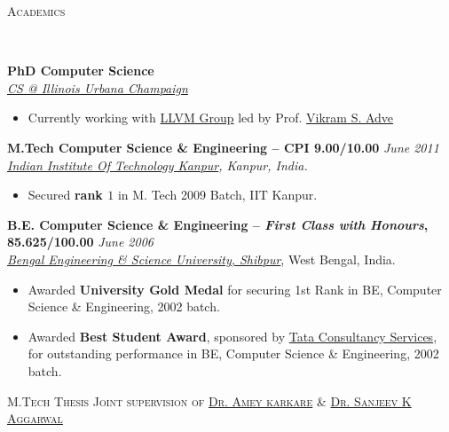 \documentclass[9pt]{article}
\newenvironment{changemargin}[2]{%
  \begin{list}{}{%
    \setlength{\topsep}{0pt}%
    \setlength{\leftmargin}{#1}%
    \setlength{\rightmargin}{#2}%
    \setlength{\listparindent}{\parindent}%
    \setlength{\itemindent}{\parindent}%
    \setlength{\parsep}{\parskip}%
  }%
  \item[]}{\end{list}
}
\newcommand{\lineover}{
	\begin{changemargin}{-0.05in}{-0.05in}
		\vspace*{-8pt}
		\hrulefill \\
		\vspace*{-2pt}
	\end{changemargin}
}
\newcommand{\header}[1]{
	\begin{changemargin}{-0.5in}{-0.5in}
		\scshape{#1}\\
  	\lineover
	\end{changemargin}
}
\newenvironment{body} {
	\vspace*{-16pt}
	\begin{changemargin}{-0.25in}{-0.5in}
  }	
	{\end{changemargin}
}
\begin{document}
\header{Academics}

\begin{body}
	\vspace{14pt}
	\textbf{PhD Computer Science }{} \hfill \\
	\emph{\href{http://cs.illinois.edu/}{CS @ Illinois Urbana Champaign}}{} \\
	\begin{itemize} \itemsep -0pt
		\item Currently working with \href{http://llvm.org/}{ LLVM Group} led by Prof. \href{http://llvm.cs.uiuc.edu/~vadve/Home.html}{Vikram S. Adve}
	\end{itemize}
 \medskip
	\textbf{M.Tech Computer Science \& Engineering -- CPI 9.00/10.00}{} \hfill \emph{June 2011}{} \\
	\emph{\href{http://www.iitk.ac.in/}{Indian Institute Of Technology Kanpur}, Kanpur, India.}{} \\
	\begin{itemize} \itemsep -0pt
		\item Secured \textbf{rank $1$} in M. Tech 2009 Batch, IIT Kanpur.
	\end{itemize}
  \medskip
	\textbf{B.E. Computer Science \& Engineering -- \emph{First Class with Honours}, 85.625/100.00} \hfill \emph{June 2006} \\
	\emph{\href{http://www.becs.ac.in/}{Bengal Engineering \& Science University, Shibpur}}, West Bengal, India.\\
	\begin{itemize} \itemsep -0pt
		\item Awarded \textbf{University Gold Medal} for securing 1st Rank in BE, Computer Science \& Engineering, 2002 batch.
		\item Awarded \textbf{Best Student Award}, sponsored by \href{http://www.tcs.com}{Tata Consultancy Services}, for outstanding performance in BE, Computer Science \& Engineering, 2002 batch.
	\end{itemize}
\end{body}

\smallskip


\header{M.Tech Thesis \hfill Joint supervision of \href{http://www.cse.iitk.ac.in/users/karkare/}{Dr. Amey karkare} \& \href{http://www.cse.iitk.ac.in/users/ska/}{Dr.  Sanjeev K Aggarwal} }
\end{document}
